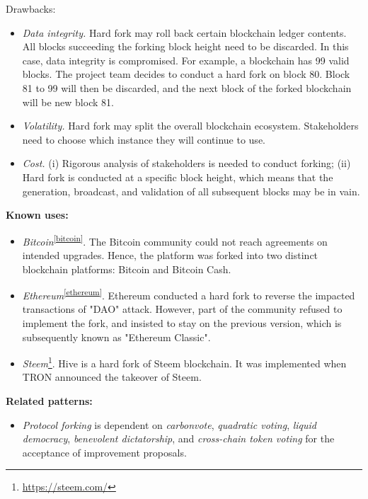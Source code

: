 \documentclass{article}
\begin{document}
Drawbacks:
\begin{itemize}
  \item \textit{Data integrity.} Hard fork may roll back certain blockchain ledger contents. All blocks succeeding the forking block height need to be discarded. In this case, data integrity is compromised. For example, a blockchain has 99 valid blocks. The project team decides to conduct a hard fork on block 80. Block 81 to 99 will then be discarded, and the next block of the forked blockchain will be new block 81.


  \item \textit{Volatility.} Hard fork may split the overall blockchain ecosystem. Stakeholders need to choose which instance they will continue to use.
  
  \item \textit{Cost.} (i) Rigorous analysis of stakeholders is needed to conduct forking; (ii) Hard fork is conducted at a specific block height, which means that the generation, broadcast, and validation of all subsequent blocks may be in vain.
\end{itemize}



\vspace{0.5em}\noindent \textbf{Known uses:}  
 \begin{itemize}
   \item \textit{Bitcoin}\textsuperscript{\ref{bitcoin}}. The Bitcoin community could not reach agreements on intended upgrades. Hence, the platform was forked into two distinct blockchain platforms: Bitcoin and Bitcoin Cash.
   
   \item \textit{Ethereum}\textsuperscript{\ref{ethereum}}. Ethereum conducted a hard fork to reverse the impacted transactions of "DAO" attack. However, part of the community refused to implement the fork, and insisted to stay on the previous version, which is subsequently known as "Ethereum Classic".
   
   \item \textit{Steem}\footnote{\url{https://steem.com/}\label{steem}}. Hive is a hard fork of Steem blockchain. It was implemented when TRON announced the takeover of Steem.
 \end{itemize}

\vspace{0.5em}\noindent \textbf{Related patterns:} 

\begin{itemize}
    \item \textit{Protocol forking} is dependent on \textit{carbonvote}, \textit{quadratic voting}, \textit{liquid democracy}, \textit{benevolent dictatorship}, and \textit{cross-chain token voting} for the acceptance of improvement proposals.
\end{itemize}
\end{document}
